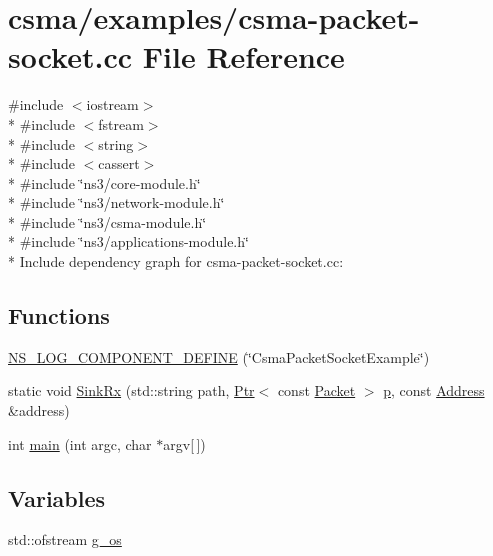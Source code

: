 \hypertarget{csma-packet-socket_8cc}{}\section{csma/examples/csma-\/packet-\/socket.cc File Reference}
\label{csma-packet-socket_8cc}
{\ttfamily \#include $<$iostream$>$}\\*
{\ttfamily \#include $<$fstream$>$}\\*
{\ttfamily \#include $<$string$>$}\\*
{\ttfamily \#include $<$cassert$>$}\\*
{\ttfamily \#include \char`\"{}ns3/core-\/module.\+h\char`\"{}}\\*
{\ttfamily \#include \char`\"{}ns3/network-\/module.\+h\char`\"{}}\\*
{\ttfamily \#include \char`\"{}ns3/csma-\/module.\+h\char`\"{}}\\*
{\ttfamily \#include \char`\"{}ns3/applications-\/module.\+h\char`\"{}}\\*
Include dependency graph for csma-\/packet-\/socket.cc\+:
\subsection*{Functions}
\begin{DoxyCompactItemize}
\item 
\hyperlink{csma-packet-socket_8cc_a25e195c96e30ff23ab4eec8f579965d5}{N\+S\+\_\+\+L\+O\+G\+\_\+\+C\+O\+M\+P\+O\+N\+E\+N\+T\+\_\+\+D\+E\+F\+I\+NE} (\char`\"{}Csma\+Packet\+Socket\+Example\char`\"{})
\item 
static void \hyperlink{csma-packet-socket_8cc_a95b1bf830622c2776ba06eb7211e6c18}{Sink\+Rx} (std\+::string path, \hyperlink{classns3_1_1Ptr}{Ptr}$<$ const \hyperlink{classns3_1_1Packet}{Packet} $>$ \hyperlink{lte__link__budget__x2__handover__measures_8m_ac9de518908a968428863f829398a4e62}{p}, const \hyperlink{classns3_1_1Address}{Address} \&address)
\item 
int \hyperlink{csma-packet-socket_8cc_a0ddf1224851353fc92bfbff6f499fa97}{main} (int argc, char $\ast$argv\mbox{[}$\,$\mbox{]})
\end{DoxyCompactItemize}
\subsection*{Variables}
\begin{DoxyCompactItemize}
\item 
std\+::ofstream \hyperlink{csma-packet-socket_8cc_a352b10ecde0ce8055a327bd473cc6fbb}{g\+\_\+os}
\end{DoxyCompactItemize}


